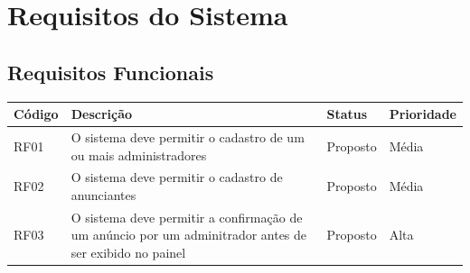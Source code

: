 \documentclass[a4paper, 12pt]{article}
\begin{document}
\section{Requisitos do Sistema}
\subsection{Requisitos Funcionais}
\begin{table}[ht]
	\centering

	\begin{tabular}{p{2cm}p{7cm}p{2cm}p{2cm}}
		\hline
		\cellcolor{gray}Código&\cellcolor{gray}Descrição&\cellcolor{gray}Status&\cellcolor{gray}Prioridade  \\
		\hline
		RF01&O sistema deve permitir o cadastro de um ou mais administradores&Proposto&M\'{e}dia\\
        RF02&O sistema deve permitir o cadastro de anunciantes&Proposto&M\'{e}dia\\
        RF03&O sistema deve permitir a confirma\c{c}\~{a}o de um an\'{u}ncio por um adminitrador antes de ser exibido no painel&Proposto&Alta\\
    \end{tabular}
\end{table}%
\newpage
\end{document}

